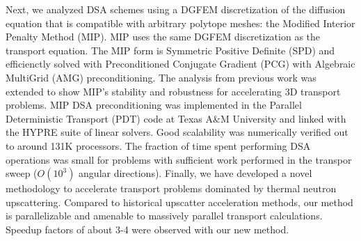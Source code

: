 Next, we analyzed DSA schemes using a DGFEM discretization of the diffusion equation that is compatible with arbitrary polytope meshes: the Modified Interior Penalty Method (MIP). MIP uses the same DGFEM discretization as the transport equation. The MIP form is Symmetric Positive Definite (SPD) and efficienctly solved with Preconditioned Conjugate Gradient (PCG) with Algebraic MultiGrid (AMG) preconditioning. The analysis from previous work was extended to show MIP's stability and robustness for accelerating 3D transport problems. MIP DSA preconditioning was implemented in the Parallel Deterministic Transport (PDT) code at Texas A\&M University and linked with the HYPRE suite of linear solvers. Good scalability was numerically verified out to around 131K processors. The fraction of time spent performing DSA operations was small for problems with sufficient work performed in the transpor sweep ($O(10^3)$ angular directions). Finally, we have developed a novel methodology to accelerate transport problems dominated by thermal neutron upscattering. Compared to historical upscatter acceleration methods, our method is parallelizable and amenable to massively parallel transport calculations. Speedup factors of about 3-4 were observed with our new method.

\pagebreak{}
